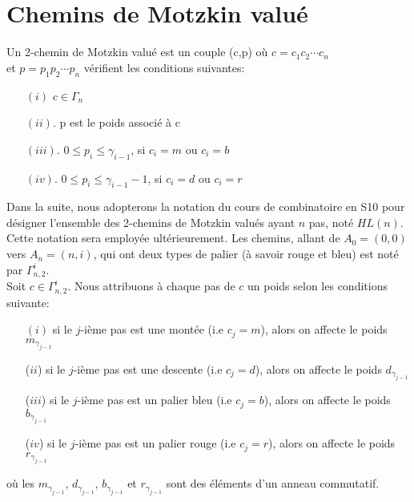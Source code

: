 \section{Chemins de Motzkin valué}
\begin{definition}
	\begin{rm}
		Un 2-chemin de Motzkin valué est un couple (c,p) où $c = c_{1}c_{2}\cdots c_{n}$\\ et $p = p_{1}p_{2}\cdots p_{n}$
		vérifient les conditions suivantes:
		\begin{itemize}
			\item[$(i)$] $c \in \Gamma_{n}$
			\item[$(ii)$.] p est le poids associé à c
			\item[$(iii)$.] $0\leq p_{i}\leq \gamma_{i-1}$, si $c_{i}=m\text{ ou }c_{i}=b$
			\item[$(iv)$.]  $0\leq p_{i}\leq \gamma_{i-1} - 1$, si  $c_{i}=d\text{ ou }c_{i}=r$
		\end{itemize}
	\end{rm}
\end{definition}
Dans la suite, nous adopterons la notation du cours de combinatoire en S10 pour désigner l'ensemble des 2-chemins de Motzkin valués ayant $n$ pas, noté $HL(n)$. Cette notation sera employée ultérieurement. Les chemins, allant de $A_{0}=(0, 0)$ vers $A_{n}=(n, i)$, qui ont deux types de palier (à savoir rouge et bleu) est noté par $\Gamma_{n, 2}^{i}$. \\
Soit $c \in \Gamma_{n, 2}^{i}$. Nous attribuons à chaque pas de $c$ un poids selon les conditions suivante:
\begin{itemize}
	\item [$(i)$] si le $j$-ième pas est une montée (i.e $c_{j}=m$), alors on affecte le poids $m_{\gamma_{j-1}}$
	\item [($ii$)] si le $j$-ième pas est une descente (i.e $c_{j}=d$), alors on affecte le poids $d_{\gamma_{j-1}}$
	\item [($iii$)]  si le $j$-ième pas est un palier bleu (i.e $c_{j}=b$), alors on affecte le poids $b_{\gamma_{j-1}}$
	\item [($iv$)]  si le $j$-ième pas est un palier rouge (i.e $c_{j}=r$), alors on affecte le poids $r_{\gamma_{j-1}}$
\end{itemize}
où les  $m_{\gamma_{j-1}}$, $d_{\gamma_{j-1}}$, $b_{\gamma_{j-1}}$ et  $r_{\gamma_{j-1}}$ sont des éléments d'un anneau commutatif.\vspace{10pt}\\
